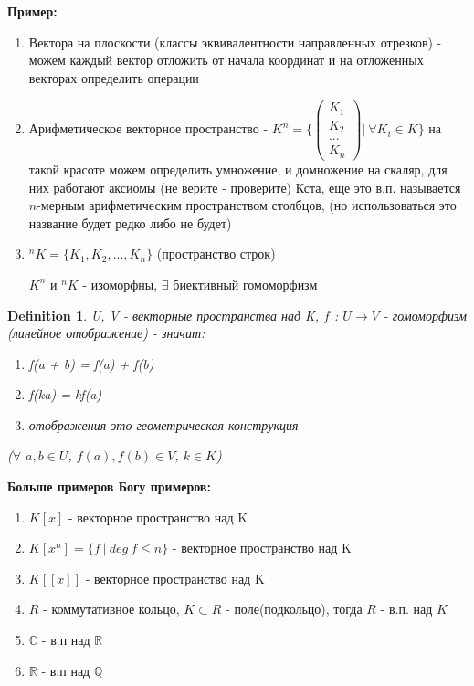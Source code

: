 \documentclass[12pt]{article}
\newtheorem{definition}{Definition}
\begin{document}
\textbf{Пример:}  
\begin{enumerate}
    \item Вектора на плоскости (классы эквивалентности направленных отрезков) - можем каждый вектор отложить от начала координат и на отложенных векторах определить операции
    \item Арифметическое векторное пространство - $K^n = \{ \begin{pmatrix}
    K_1 \\
    K_2\\
    ... \\
    K_n
  \end{pmatrix} |\  \forall K_i \in K\}$ на такой красоте можем определить умножение, и домножение на скаляр, для них работают аксиомы (не верите - проверите)
  Кста, еще это в.п. называется $n$-мерным арифметическим пространством столбцов, (но использоваться это название будет редко либо не будет)
  \item $ ^nK = \{ K_1, K_2, ..., K_n \}$ (пространство строк)
  
  $K^n$ и $ ^nK$ - изоморфны, $\exists$ биективный гомоморфизм
\end{enumerate} 

 



\begin{definition}
    U, V - векторные пространства над K, $f$ : $U \rightarrow V$ - гомоморфизм (линейное отображение) - значит:
    \begin{enumerate}
        \item f(a + b) = f(a) + f(b)
        \item f(ka) = kf(a) 
        \item отображения это геометрическая конструкция
    \end{enumerate}
    ($ \forall$ $ a, b \in U$, $f(a), f(b) \in V$, $k \in K$)
\end{definition} 


\textbf{Больше примеров Богу примеров:}
\begin{enumerate}
    \item $K[x]$ - векторное пространство над K
    \item $K[x^n]=\{f\ |\ deg\ f\leq n\}$ - векторное пространство над K
    \item $K[[x]]$ - векторное пространство над K
    \item $R$ - коммутативное кольцо, $K \subset R$ - поле(подкольцо), тогда $R$ - в.п. над $K$
    \item $\mathbb{C}$ - в.п над $\mathbb{R}$
    \item $\mathbb{R}$ - в.п над $\mathbb{Q}$
\end{enumerate}
\end{document}
